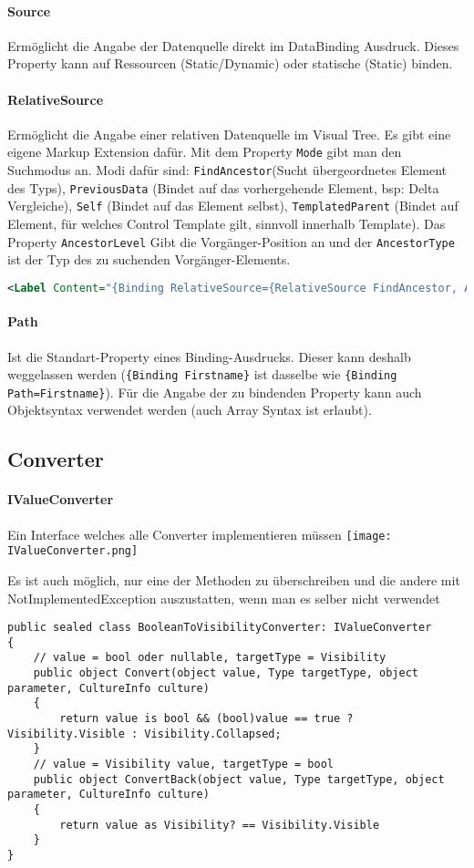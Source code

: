 \paragraph{Source} Ermöglicht die Angabe der Datenquelle direkt im DataBinding Ausdruck. Dieses Property kann auf Ressourcen (Static/Dynamic) oder statische (Static) binden.
\paragraph{RelativeSource} Ermöglicht die Angabe einer relativen Datenquelle im Visual Tree. Es gibt eine eigene Markup Extension dafür. Mit dem Property \verb+Mode+ gibt man den Suchmodus an. Modi dafür sind: \verb+FindAncestor+(Sucht übergeordnetes Element des Typs), \verb+PreviousData+ (Bindet auf das vorhergehende Element, bsp: Delta Vergleiche), \verb+Self+ (Bindet auf das Element selbst), \verb+TemplatedParent+ (Bindet auf Element, für welches Control Template gilt, sinnvoll innerhalb Template). Das Property \verb+AncestorLevel+ Gibt die Vorgänger-Position an und der \verb+AncestorType+ ist der Typ des zu suchenden Vorgänger-Elements.
\begin{lstlisting}[language=xml]
<Label Content="{Binding RelativeSource={RelativeSource FindAncestor, AncestorType=Window}, Path=Title}" />
\end{lstlisting}
\paragraph{Path} Ist die Standart-Property eines Binding-Ausdrucks. Dieser kann deshalb weggelassen werden (\verb+{Binding Firstname}+ ist dasselbe wie \verb+{Binding Path=Firstname}+). Für die Angabe der zu bindenden Property kann auch Objektsyntax verwendet werden (auch Array Syntax ist erlaubt).
\subsection{Converter}
\paragraph{IValueConverter} Ein Interface welches alle Converter implementieren müssen
\texttt{[image: IValueConverter.png]}

Es ist auch möglich, nur eine der Methoden zu überschreiben und die andere mit NotImplementedException auszustatten, wenn man es selber nicht verwendet

\begin{lstlisting}[caption="Konvertiert bool oder Nullable in Visibility und zurück"]
public sealed class BooleanToVisibilityConverter: IValueConverter
{
    // value = bool oder nullable, targetType = Visibility
    public object Convert(object value, Type targetType, object parameter, CultureInfo culture)
    {
        return value is bool && (bool)value == true ? Visibility.Visible : Visibility.Collapsed;
    }
    // value = Visibility value, targetType = bool
    public object ConvertBack(object value, Type targetType, object parameter, CultureInfo culture)
    {
        return value as Visibility? == Visibility.Visible
    }
}
\end{lstlisting}
